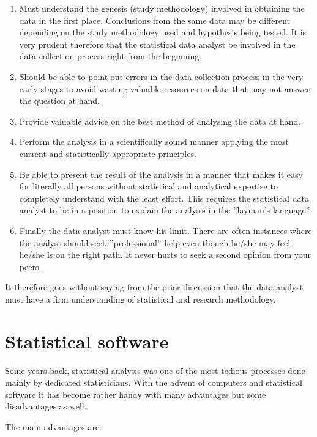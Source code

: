 \documentclass[
]{book}
\providecommand{\tightlist}{%
  \setlength{\itemsep}{0pt}\setlength{\parskip}{0pt}}
\theoremstyle{definition}
\theoremstyle{definition}
\theoremstyle{definition}
\theoremstyle{definition}
\theoremstyle{remark}
\begin{document}
\begin{enumerate}
\def\labelenumi{\arabic{enumi}.}
\tightlist
\item
  Must understand the genesis (study methodology) involved in obtaining the
  data in the first place. Conclusions from the same data may be different
  depending on the study methodology used and hypothesis being tested. It is very prudent therefore that the statistical data analyst be involved in the data collection process right from the beginning.
\item
  Should be able to point out errors in the data collection process in the very early stages to avoid wasting valuable resources on data that may not answer the question at hand.
\item
  Provide valuable advice on the best method of analysing the data at hand.
\item
  Perform the analysis in a scientifically sound manner applying the most
  current and statistically appropriate principles.
\item
  Be able to present the result of the analysis in a manner that makes it easy for literally all persons without statistical and analytical expertise to completely understand with the least effort. This requires the statistical data analyst to be in a position to explain the analysis in the ''layman's language''.
\item
  Finally the data analyst must know his limit. There are often instances where the analyst should seek ''professional'' help even though he/she may feel he/she is on the right path. It never hurts to seek a second opinion from your peers.
\end{enumerate}

It therefore goes without saying from the prior discussion that the data analyst
must have a firm understanding of statistical and research methodology.

\hypertarget{statistical-software}{%
\section{Statistical software}\label{statistical-software}}

Some years back, statistical analysis was one of the most tedious processes done mainly by dedicated statisticians. With the advent of computers and statistical software it has become rather handy with many advantages but some disadvantages as well.

The main advantages are:
\end{document}
